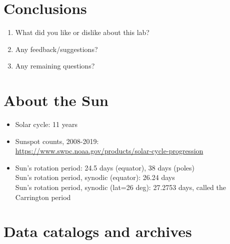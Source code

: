 \documentclass[11pt]{article}%
\newcommand{\SPACE}{\vspace{3em}}
\begin{document}
\section{Conclusions}
\begin{enumerate}
    \item What did you like or dislike about this lab?  \SPACE
    \item Any feedback/suggestions?\SPACE
    \item Any remaining questions?\SPACE
\end{enumerate}



\newpage
\pagebreak
\appendix

\section{About the Sun}

\begin{itemize}
    \item Solar cycle: 11 years
    \item Sunspot counts, 2008-2019: \\
        \url{https://www.swpc.noaa.gov/products/solar-cycle-progression}
    \item Sun's rotation period: 24.5 days (equator), 38 days (poles) \\
        Sun's rotation period, synodic (equator): 26.24 days \\
        Sun's rotation period, synodic (lat=26 deg): 27.2753 days, called the Carrington period
\end{itemize}

\section{Data catalogs and archives}
\end{document}
